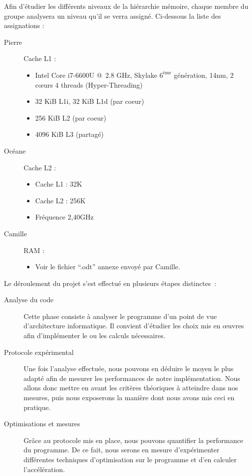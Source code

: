 \documentclass[12pt,a4paper]{article}
\begin{document}
Afin d'étudier les différents niveaux de la hiérarchie mémoire, chaque membre du
groupe analysera un niveau qu'il se verra assigné. Ci-dessous la liste des
assignations :
\begin{description}

    \item[Pierre] Cache L1 : 
        \begin{itemize}
            \item Intel Core i7-6600U @ 2.8 GHz, Skylake $6^{\text{ème}}$ génération, 14nm, 2 cœurs 4 threads (Hyper-Threading)
            \item 32 KiB L1i, 32 KiB L1d (par coeur)
            \item 256 KiB L2 (par coeur)
            \item 4096 KiB L3 (partagé)
        \end{itemize}
    \item[Océane] Cache L2 : 
        \begin{itemize}
            \item Cache L1 : 32K
            \item Cache L2 : 256K
            \item Fréquence 2,40GHz
        \end{itemize}
    \item[Camille] RAM : 
        \begin{itemize}
            \item Voir le fichier \enquote{.odt} annexe envoyé par Camille.
        \end{itemize}
\end{description} 

Le déroulement du projet s'est effectué en plusieurs étapes distinctes :
\begin{description}
    \item[Analyse du code] Cette phase consiste à analyser le programme d'un
        point de vue d'architecture informatique. Il convient d'étudier les
        choix mis en œuvres afin d'implémenter le ou les calculs nécessaires.
    \item[Protocole expérimental] Une fois l'analyse effectuée, nous
        pouvons en déduire le moyen le plus adapté afin de mesurer les
        performances de notre implémentation. Nous allons donc mettre en
        avant les critères théoriques à atteindre dans nos mesures, puis
        nous exposerons la manière dont nous avons mis ceci en pratique.
    \item[Optimisations et mesures] Grâce au protocole mis en place, nous
        pouvons quantifier la performance du programme. De ce fait, nous serons
        en mesure d'expérimenter différentes techniques d'optimisation sur le
        programme et d'en calculer l'accélération.
\end{description}
\end{document}
